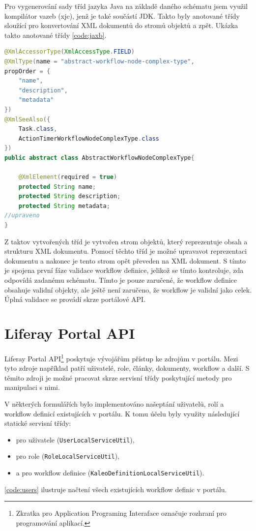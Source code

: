 \documentclass{fithesis}
\begin{document}
Pro vygenerování sady tříd jazyka Java na základě daného schématu jsem využil kompilátor vazeb (xjc), jenž je také součástí JDK. Takto byly anotované třídy sloužící pro konvertování XML dokumentů do stromů objektů a zpět. Ukázka takto anotované třídy \autoref{code:jaxb}.

\begin{lstlisting}[language=Java, float =h , caption = Java třída s JAXB anotacemi , label = code:jaxb ]
@XmlAccessorType(XmlAccessType.FIELD)
@XmlType(name = "abstract-workflow-node-complex-type", 
propOrder = {
    "name",
    "description",
    "metadata"
})
@XmlSeeAlso({
    Task.class,
    ActionTimerWorkflowNodeComplexType.class
})
public abstract class AbstractWorkflowNodeComplexType{

    @XmlElement(required = true)
    protected String name;
    protected String description;
    protected String metadata;
//upraveno
}

\end{lstlisting}

Z taktov vytvořených tříd je vytvořen strom objektů, který reprezentuje obsah a strukturu XML dokumentu. Pomocí těchto tříd je možné upravavot reprezentaci dokumentu a nakonec je tento strom opět převeden na XML dokument. S tímto je spojena první fáze validace workflow definice, jelikož se tímto kontroluje, zda odpovídá zadanému schématu. Tímto je pouze zaručené, že workflow definice obsahuje validní objekty, ale ještě není zaručeno, že workflow je validní jako celek. Úplná validace se provádí skrze portálové API.



\section{Liferay Portal API} 
\label{sec:portal_api}
Liferay Portal API\footnote{Zkratka pro Application Programing Interaface označuje rozhraní pro programování aplikací.} poskytuje vývojářům přístup ke zdrojům v portálu. Mezi tyto zdroje například patří uživatelé, role, články, dokumenty, workflow a další. S těmito zdroji je možné pracovat skrze servisní třídy poskytující metody pro manipulaci s nimi.

V některých formulářích bylo implementováno našeptání uživatelů, rolí a workflow definicí existujících v portálu. K tomu účelu byly využity následující statické servisní třídy: 
\begin{itemize}
\item pro uživatele  (\verb|UserLocalServiceUtil|),
\item pro role (\verb|RoleLocalServiceUtil|),
\item a pro workflow definice (\verb|KaleoDefinitionLocalServiceUtil|).
\end{itemize}
\autoref{code:users} ilustruje načtení všech existujících workflow definic v portálu.
\end{document}
